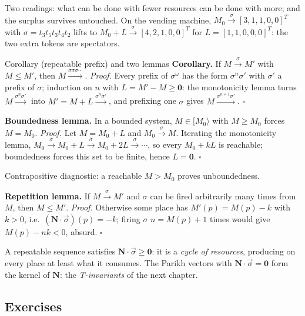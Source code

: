 Two readings: what can be done with fewer resources can be done with more; and the surplus survives untouched. On the vending machine, $M_0 \xrightarrow{\sigma} [3,1,1,0,0]^T$ with $\sigma = t_3 t_5 t_3 t_4 t_2$ lifts to $M_0 + L \xrightarrow{\sigma} [4,2,1,0,0]^T$ for $L = [1,1,0,0,0]^T$: the two extra tokens are spectators.

\begin{definitionbox}{Corollary (repeatable prefix) and two lemmas}
\textbf{Corollary.} If $M \xrightarrow{\sigma} M'$ with $M \le M'$, then $M \xrightarrow{\sigma\sigma\sigma\cdots}$.
\textit{Proof.} Every prefix of $\sigma^\omega$ has the form $\sigma^n \sigma'$ with $\sigma'$ a prefix of $\sigma$; induction on $n$ with $L = M' - M \geq \mathbf{0}$: the monotonicity lemma turns $M \xrightarrow{\sigma^n \sigma'}$ into $M' = M + L \xrightarrow{\sigma^n \sigma'}$, and prefixing one $\sigma$ gives $M \xrightarrow{\sigma^{n+1} \sigma'}$. \hfill$\square$
\par\smallskip
\textbf{Boundedness lemma.} In a bounded system, $M \in [M_0\rangle$ with $M \ge M_0$ forces $M = M_0$.
\textit{Proof.} Let $M = M_0 + L$ and $M_0 \xrightarrow{\sigma} M$. Iterating the monotonicity lemma, $M_0 \xrightarrow{\sigma} M_0 + L \xrightarrow{\sigma} M_0 + 2L \xrightarrow{\sigma} \cdots$, so every $M_0 + kL$ is reachable; boundedness forces this set to be finite, hence $L = \mathbf{0}$. \hfill$\square$
\par\smallskip
Contrapositive diagnostic: a reachable $M > M_0$ proves unboundedness.
\par\medskip
\textbf{Repetition lemma.} If $M \xrightarrow{\sigma} M'$ and $\sigma$ can be fired arbitrarily many times from $M$, then $M \le M'$.
\textit{Proof.} Otherwise some place has $M'(p) = M(p) - k$ with $k > 0$, i.e.\ $(\mathbf{N} \cdot \vec{\sigma})(p) = -k$; firing $\sigma$ $n = M(p) + 1$ times would give $M(p) - nk < 0$, absurd. \hfill$\square$
\par\smallskip
A repeatable sequence satisfies $\mathbf{N} \cdot \vec{\sigma} \geq \mathbf{0}$: it is a \emph{cycle of resources}, producing on every place at least what it consumes. The Parikh vectors with $\mathbf{N} \cdot \vec{\sigma} = \mathbf{0}$ form the kernel of $\mathbf{N}$: the \emph{T-invariants} of the next chapter.
\end{definitionbox}

\subsection{Exercises}

